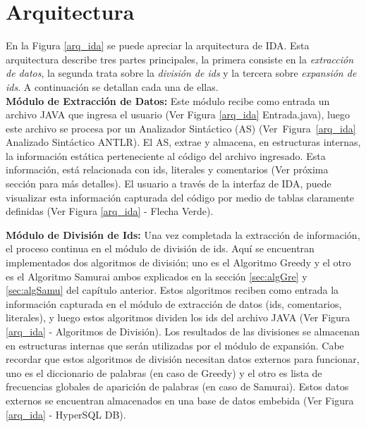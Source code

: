 \section{Arquitectura}


En la Figura \ref{arq_ida} se puede apreciar la arquitectura de IDA. Esta arquitectura describe tres partes principales, la primera consiste en la \textit{extracción de datos}, la segunda trata sobre la \textit{división de ids} y la tercera sobre \textit{expansión de ids}. A continuación se detallan cada una de ellas.\\

\textbf{Módulo de Extracción de Datos:} Este módulo recibe como entrada un archivo JAVA que ingresa el usuario (Ver Figura \ref{arq_ida} Entrada.java), luego este archivo se procesa por un Analizador Sintáctico (AS) (\mbox{Ver Figura \ref{arq_ida}} Analizado Sintáctico ANTLR). El AS, extrae y almacena, en estructuras internas, la información estática perteneciente al código del archivo ingresado. Esta información, está relacionada con ids, literales y comentarios (Ver próxima sección para más detalles). El usuario a través de la interfaz de IDA, puede visualizar esta información capturada del código por medio de tablas claramente definidas (Ver Figura \ref{arq_ida} - Flecha Verde).

\textbf{Módulo de División de Ids:} Una vez completada la extracción de información, el proceso continua en el módulo de división de ids. Aquí se encuentran implementados dos algoritmos de división; uno es el Algoritmo Greedy y el otro es el Algoritmo Samurai ambos explicados en la sección \ref{sec:algGre} y \ref{sec:algSamu} del capítulo anterior. Estos algoritmos reciben como entrada la información capturada en el módulo de extracción de datos (ids, comentarios, literales), y luego estos algoritmos dividen los ids del archivo JAVA (Ver Figura \ref{arq_ida} - Algoritmos de División). Los resultados de las divisiones se almacenan en estructuras internas que serán utilizadas por el módulo de expansión. Cabe recordar que estos algoritmos de división necesitan datos externos para funcionar, uno es el diccionario de palabras (en caso de Greedy) y el otro es lista de frecuencias globales de aparición de palabras (en caso de Samurai). Estos datos externos se encuentran almacenados en una base de datos embebida (Ver Figura \ref{arq_ida} - HyperSQL DB).

